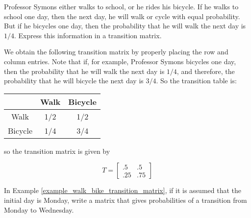 \begin{example} \label{example_walk_bike_transition_matrix}
    Professor Symons either walks to school, or he rides his bicycle.  If he walks to school one day, then the next day, he will walk or cycle with equal probability.  But if he bicycles one day, then the probability that he will walk the next day is $1/4$.  Express this information in a transition matrix.
\end{example}
\begin{solution} We obtain the following transition matrix by properly placing the row and column entries.  Note that if, for example, Professor Symons bicycles one day, then the probability that he will walk the next day is $1/4$, and therefore, the probability that he will bicycle the next day is $3/4$. So the transition table is:
    \begin{center}
        \begin{tabular}{c|cc}
                    & Walk & Bicycle \\
            \hline
            Walk    & 1/2  & 1/2     \\
            Bicycle & 1/4  & 3/4     \\
        \end{tabular}
    \end{center}

    so the transition matrix is given by

    \[
        T = \begin{bmatrix}
            .5  & .5  \\
            .25 & .75
        \end{bmatrix}
    \]
\end{solution}

\begin{example}\label{example_walk_bike_transition_matrix2}
    In Example \ref{example_walk_bike_transition_matrix}, if it is assumed that the initial day is Monday, write a matrix that gives probabilities of a transition from Monday to Wednesday.
\end{example}


